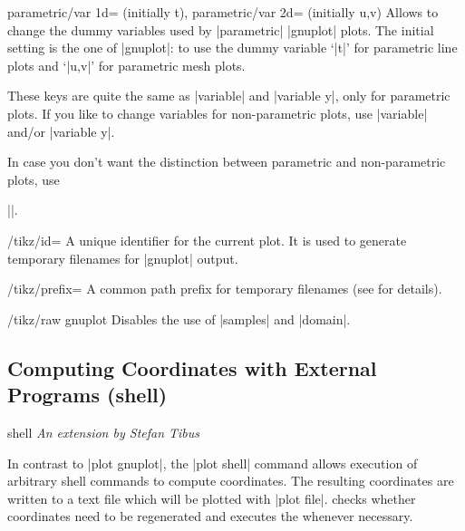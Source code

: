 {\begin{pgfplotskeylist}{%
    parametric/var 1d= (initially t),
    parametric/var 2d= (initially {u,v})%
}
    Allows to change the dummy variables used by |parametric| |gnuplot| plots.
    The initial setting is the one of |gnuplot|: to use the dummy variable
    `|t|' for parametric line plots and `|u,v|' for parametric mesh plots.

    These keys are quite the same as |variable| and |variable y|, only for
    parametric plots. If you like to change variables for non-parametric plots,
    use |variable| and/or |variable y|.

    In case you don't want the distinction between parametric and
    non-parametric plots, use

    |\pgfplotsset{parametric/var 1d=,parametric/var 2d=}|.
\end{pgfplotskeylist}

\begin{key}{/tikz/id=}
    A unique identifier for the current plot. It is used to generate temporary
    filenames for |gnuplot| output.
\end{key}

\begin{key}{/tikz/prefix=}
    A common path prefix for temporary filenames (see \cite[Section~18.6]{tikz}
    for details).
\end{key}

\begin{key}{/tikz/raw gnuplot}
    Disables the use of |samples| and |domain|.
\end{key}


\subsection{Computing Coordinates with External Programs (shell)}

\begin{addplotoperation}[]{shell}{}
{\small \emph{An extension by Stefan Tibus}}

    In contrast to |plot gnuplot|, the |plot shell| command allows execution of
    arbitrary shell commands to compute coordinates. The resulting coordinates
    are written to a text file which will be plotted with |plot file|. \PGF{}
    checks whether coordinates need to be regenerated and executes the
     whenever necessary.


\end{addplotoperation}}
